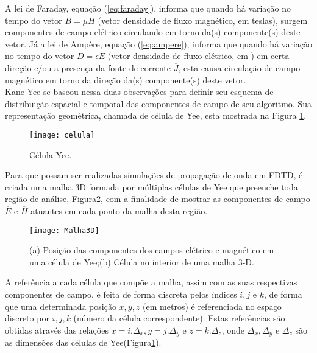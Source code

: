 A lei de Faraday, equação (\ref{eq:faraday}), informa que quando há variação no tempo do vetor $\overline{B}=\mu\overline{H}$ (vetor densidade de fluxo magnético, em teslas), surgem componentes de campo elétrico circulando em torno da(s) componente(s) deste vetor. Já a lei de Ampère, equação (\ref{eq:ampere}), informa que quando há variação no tempo do vetor $\overline{D}=\epsilon\overline{E}$ (vetor densidade de fluxo elétrico, em ) em certa direção e/ou a presença da fonte de corrente $\overline{J}$, esta causa circulação de campo magnético em torno da direção da(s) componente(s) deste vetor.\\
			
Kane Yee se baseou nessa duas observações para definir seu esquema  de distribuição espacial  e temporal das componentes  de campo  de seu algoritmo. Sua representação geométrica, chamada de célula de Yee, esta mostrada na Figura \ref{fg:celulaYee}\cite{rodrigo}.\\
			
\begin{figure}[ht!]
\centering
	\texttt{[image: celula]}
	\caption{Célula Yee.}
	\label{fg:celulaYee}
\end{figure} 
		
Para que possam ser realizadas simulações de propagação de onda em FDTD, é criada uma malha 3D formada por múltiplas células de Yee que preenche toda região de análise, Figura\ref{fg:grade}\cite{almeida}, com a finalidade de mostrar as componentes de campo $\overline{E}$ e $\overline{H}$ atuantes em cada ponto da malha desta região.	\\
\begin{figure}[ht!]
	\centering
	\texttt{[image: Malha3D]}
	\caption{(a) Posição das componentes dos campos elétrico e magnético em uma célula de Yee;(b) Célula no interior de uma malha 3-D.}
	\label{fg:grade}
\end{figure} 

A referência a cada célula que compõe a malha, assim com as suas respectivas componentes de campo, é feita de forma discreta pelos índices $i, j$ e $k$, de forma que uma determinada posição $x, y, z$ (em metros) é referenciada no espaço discreto por $i, j, k$ (número da célula correspondente). Estas  referências são obtidas através das relações $x = i.\Delta_x, y = j.\Delta_{y}$ e $z = k.\Delta_z$, onde  $\Delta_x,  \Delta_y$ e $\Delta_z$ são as dimensões das células de Yee(Figura\ref{fg:celulaYee}).
